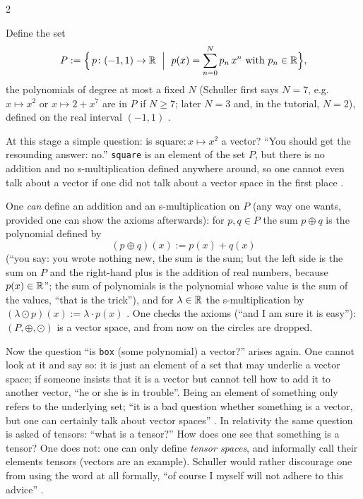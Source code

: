\begin{paracol}{2}
\begin{example}\label{ex:c03-P}
Define the set
\[
  P:=\Bigl\{\,p\colon(-1,1)\to\R\ \Bigm|\ p(x)=\sum_{n=0}^{N}p_n\,x^n\ \text{with}\ p_n\in\R\Bigr\},
\]
the polynomials of degree at most a fixed $N$ (Schuller first says $N=7$, e.g.\ $x\mapsto x^2$ or $x\mapsto 2+x^7$ are in $P$ if $N\ge7$; later $N=3$ and, in the tutorial, $N=2$), defined on the real interval $(-1,1)$
.
\end{example}
At this stage a simple question: is $\mathrm{square}\colon x\mapsto x^2$ a vector? ``You should get the resounding answer: no.'' \texttt{square} is an element of the set $P$, but there is no addition and no s-multiplication defined anywhere around, so one
cannot even talk about a vector if one did not talk about a vector space in the first place .

One \emph{can} define an addition and an s-multiplication on $P$ (any way one wants, provided one can show the axioms afterwards): for $p,q\in P$ the sum $p\oplus q$ is the polynomial defined by
\[
  (p\oplus q)(x):=p(x)+q(x)
\]
(``you say: you wrote nothing new, the sum is the sum; but the left side is the sum on $P$ and the right-hand plus is the addition of real numbers, because $p(x)\in\mathbb{R}$''; the sum of polynomials is the polynomial whose value is the sum of the values, ``that is the trick''),
and for $\lambda\in\mathbb{R}$ the s-multiplication by $(\lambda\odot p)(x):=\lambda\cdot p(x)$ .
One checks the axioms (``and I am sure it is easy''): $(P,\oplus,\odot)$ is a vector space, and from now on the circles are dropped.

Now the question ``is \texttt{box} (some polynomial) a vector?'' arises again. One cannot look at it and say so: it is just an element of a set that may underlie a vector space; if someone insists that it is a vector but cannot tell how to add it to
another vector, ``he or she is in trouble''. Being an element of something only refers to the underlying set; ``it is a bad question whether something is a vector, but one can certainly talk about vector spaces''
.
In relativity the same question is asked of tensors: ``what is a tensor?'' How does one see that something is a tensor? One does not: one can only define \emph{tensor spaces}, and informally call their elements tensors (vectors are an example).
Schuller would rather discourage one from using the word at all formally, ``of course I myself will not adhere to this advice'' .


\end{paracol}

